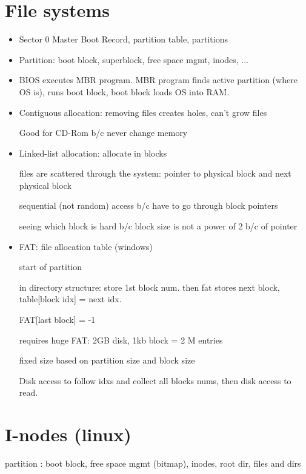 \documentclass[11pt]{article}
\begin{document}
\section{File systems}
\begin{itemize}
    \item Sector 0 Master Boot Record, partition table, partitions
    \item Partition: boot block, superblock, free space mgmt, inodes, ...

    \item BIOS executes MBR program. MBR program finds active partition (where OS is), runs boot block,
        boot block loads OS into RAM.

    \item Contiguous allocation: removing files creates holes, can't grow files

        Good for CD-Rom b/c never change memory

    \item Linked-list allocation: allocate in blocks

        files are scattered through the system: pointer to physical block and next physical block

        sequential (not random) access b/c have to go through block pointers

        seeing which block is hard b/c block size is not a power of 2 b/c of pointer

    \item FAT: file allocation table (windows)

        start of partition

        in directory structure: store 1st block num. then fat stores next block, table[block idx] = next idx.

        FAT[last block] = -1

        requires huge FAT: 2GB disk, 1kb block = 2 M entries

        fixed size based on partition size and block size

        Disk access to follow idxs and collect all blocks nums, then disk access to read.

\end{itemize}

\section{I-nodes (linux)}

partition : boot block, free space mgmt (bitmap), inodes, root dir, files and dirs \\
\end{document}
